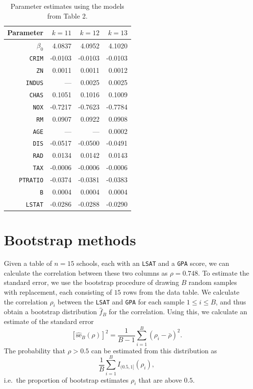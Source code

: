 \documentclass[10pt]{article}
\begin{document}
    \begin{table}[H]
        \centering
        \caption{Parameter estimates using the models from Table 2.}
        \vspace{0.8em}
        \label{tab:models_parameters}
        \begin{tabular}{|r|r|r|r|} \hline
                 Parameter &  $k = 11$ &  $k = 12$ &  $k = 13$ \\\hline
                 $\beta_0$ &    4.0837 &    4.0952 &    4.1020 \\
             \texttt{CRIM} &   -0.0103 &   -0.0103 &   -0.0103 \\
               \texttt{ZN} &    0.0011 &    0.0011 &    0.0012 \\
            \texttt{INDUS} &       --- &    0.0025 &    0.0025 \\
             \texttt{CHAS} &    0.1051 &    0.1016 &    0.1009 \\
              \texttt{NOX} &   -0.7217 &   -0.7623 &   -0.7784 \\
               \texttt{RM} &    0.0907 &    0.0922 &    0.0908 \\
              \texttt{AGE} &       --- &       --- &    0.0002 \\
              \texttt{DIS} &   -0.0517 &   -0.0500 &   -0.0491 \\
              \texttt{RAD} &    0.0134 &    0.0142 &    0.0143 \\
              \texttt{TAX} &   -0.0006 &   -0.0006 &   -0.0006 \\
          \texttt{PTRATIO} &   -0.0374 &   -0.0381 &   -0.0383 \\
                \texttt{B} &    0.0004 &    0.0004 &    0.0004 \\
            \texttt{LSTAT} &   -0.0286 &   -0.0288 &   -0.0290 \\\hline
        \end{tabular}
    \end{table}




    \section{Bootstrap methods}

    Given a table of $n = 15$ schools, each with an \texttt{LSAT} and a \texttt{GPA}
    score, we can calculate the correlation between these two columns as $\rho =
    0.748$. To estimate the standard error, we use the bootstrap procedure of drawing
    $B$ random samples with replacement, each consisting of $15$ rows from the data
    table. We calculate the correlation $\rho_i$ between the \texttt{LSAT} and
    \texttt{GPA} for each sample $1 \leq i \leq B$, and thus obtain a bootstrap
    distribution $\hat{f}_B$ for the correlation. Using this, we calculate an
    estimate of the standard error \[
        [\hat{\text{se}}_B(\rho)]^2 =
        \frac{1}{B - 1} \sum_{i = 1}^B (\rho_i - \bar{\rho})^2.
    \] The probability that $\rho > 0.5$ can be estimated from this distribution
    as \[
        \frac{1}{B}\sum_{i = 1}^B I_{(0.5, 1]}(\rho_i),
    \] i.e.\ the proportion of bootstrap estimates $\rho_i$ that are above $0.5$.
\end{document}
